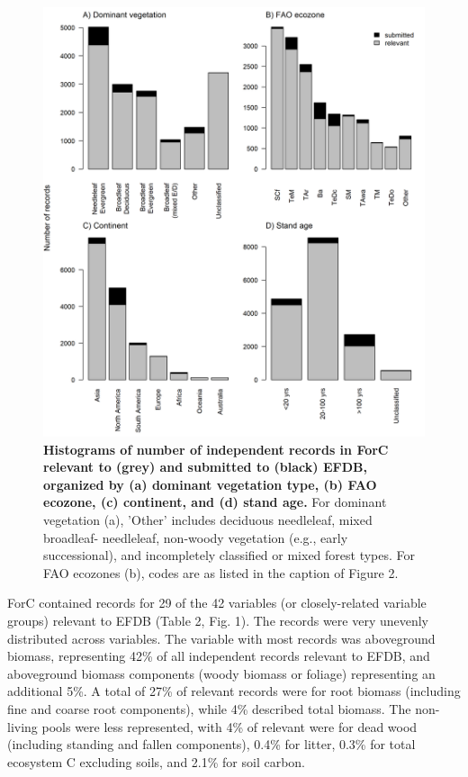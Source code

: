 \documentclass[, manuscript]{copernicus}
\begin{document}
\newpage
\begin{figure}
\includegraphics[width=15cm]{figures_tables/Histogram_n_Relevant_and_Transferred_Records} \caption{\textbf{Histograms of number of independent records in ForC relevant to (grey) and submitted to (black) EFDB, organized by (a) dominant vegetation type, (b) FAO ecozone, (c) continent, and (d) stand age.} For dominant vegetation (a), 'Other' includes deciduous needleleaf, mixed broadleaf- needleleaf, non-woody vegetation (e.g., early successional), and incompletely classified or mixed forest types. For FAO ecozones (b), codes are as listed in the caption of Figure 2.}\label{fig:fig_histograms}
\end{figure}

ForC contained records for 29 of the 42 variables (or closely-related
variable groups) relevant to EFDB (Table 2, Fig. 1). The records were
very unevenly distributed across variables. The variable with most
records was aboveground biomass, representing 42\% of all independent
records relevant to EFDB, and aboveground biomass components (woody
biomass or foliage) representing an additional 5\%. A total of 27\% of
relevant records were for root biomass (including fine and coarse root
components), while 4\% described total biomass. The non-living pools
were less represented, with 4\% of relevant were for dead wood
(including standing and fallen components), 0.4\% for litter, 0.3\% for
total ecosystem C excluding soils, and 2.1\% for soil carbon.
\end{document}
